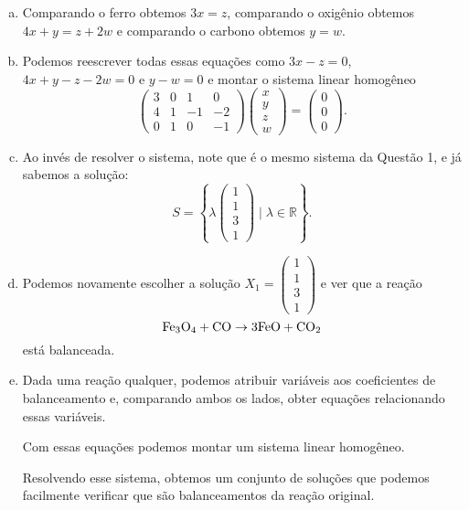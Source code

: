 \documentclass[a4paper,10pt]{article}
\def\R{\mathbb R}
\newenvironment{sol}{\begin{tcolorbox}[breakable,colback=blue!5!white,colframe=blue!40!white,title=\normalsize {\sc{Solução}},coltitle=black]}{\end{tcolorbox}}
\begin{document}
\begin{sol}
	\begin{enumerate}[a)]
		\item Comparando o ferro obtemos $3x=z$, comparando o oxigênio obtemos $4x+y=z+2w$ e comparando o carbono obtemos $y=w$.
		\item Podemos reescrever todas essas equações como $3x-z=0$, $4x+y-z-2w=0$ e $y-w=0$ e montar o sistema linear homogêneo
		\[\begin{pmatrix}
		3&0&1&0\\4&1&-1&-2\\0&1&0&-1
		\end{pmatrix}\begin{pmatrix}
		x\\y\\z\\w
		\end{pmatrix}=\begin{pmatrix}
		0\\0\\0
		\end{pmatrix}.\]
		\item Ao invés de resolver o sistema, note que é o mesmo sistema da Questão 1, e já sabemos a solução:\[S=\left\{\lambda \begin{pmatrix}
		1\\1\\3\\1
		\end{pmatrix}\mid \lambda\in \R \right\}.\]
		\item Podemos novamente escolher a solução $X_1=\begin{pmatrix}
		1\\1\\3\\1
		\end{pmatrix}$ e ver que a reação
		\[{\rm Fe_3O_4}+{\rm CO}\rightarrow 3{\rm FeO}+{\rm CO_2}\]está balanceada.
		\item Dada uma reação qualquer, podemos atribuir variáveis aos coeficientes de balanceamento e, comparando ambos os lados, obter equações relacionando essas variáveis.
		
		Com essas equações podemos montar um sistema linear homogêneo.
		
		Resolvendo esse sistema, obtemos um conjunto de soluções que podemos facilmente verificar que são balanceamentos da reação original.
	\end{enumerate}
\end{sol}
\end{document}
